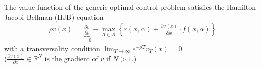 \documentclass[11pt]{elegantbook}
\begin{document}
\begin{proposition}
    The value function of the generic optimal control problem satisfies the Hamilton-Jacobi-Bellman (HJB) equation
    \begin{equation}
        \begin{aligned}
            \rho v(x) = \underbrace{\frac{\partial v}{\partial t}}_{=0} + \max_{\alpha\in A}\left\{r(x,\alpha) + \frac{\partial v(x)}{\partial x}\cdot f(x,\alpha)\right\}
        \end{aligned}
        \nonumber
    \end{equation}
    with a transversality condition $\lim_{T \rightarrow \infty}e^{-\rho T}v_T(x)=0$.\\
    ($\frac{\partial v(x)}{\partial x}\in \mathbb{R}^N$ is the gradient of $v$ if $N>1$.)
\end{proposition}
\end{document}
